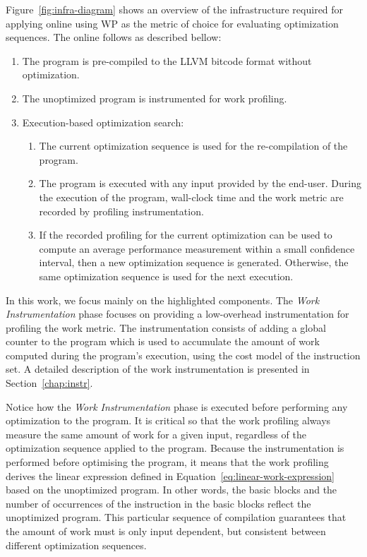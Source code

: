 Figure~\ref{fig:infra-diagram} shows an overview of the infrastructure required for applying online {\itercomp}
using WP as the metric of choice for evaluating optimization sequences.
The online {\itercomp} follows as described bellow:
\begin{enumerate}
\item The program is pre-compiled to the LLVM bitcode format without optimization.
\item The unoptimized program is instrumented for work profiling.
\item Execution-based optimization search:
 \begin{enumerate}
   \item The current optimization sequence is used for the re-compilation of the program.
   \item The program is executed with any input provided by the end-user.
         During the execution of the program, wall-clock time and the work metric are recorded by profiling instrumentation.
   \item If the recorded profiling for the current optimization can be used to compute an average performance measurement within a small confidence interval,
         then a new optimization sequence is generated.
         Otherwise, the same optimization sequence is used for the next execution.
 \end{enumerate}
\end{enumerate}

In this work, we focus mainly on the highlighted components.
The \textit{Work Instrumentation} phase focuses on providing a low-overhead instrumentation for profiling the work metric.
The instrumentation consists of adding a global counter to the program which is used to accumulate the amount of work computed during the program's execution, using the cost model of the instruction set.
A detailed description of the work instrumentation is presented in Section~\ref{chap:instr}.

Notice how the \textit{Work Instrumentation} phase is executed before performing any optimization to the program.
It is critical so that the work profiling always measure the same amount of work for a given input, regardless of the optimization sequence applied to the program.
Because the instrumentation is performed before optimising the program, it means that the work profiling derives the linear expression defined in Equation~\ref{eq:linear-work-expression}
based on the unoptimized program.
In other words, the basic blocks and the number of occurrences of the instruction in the basic blocks reflect the unoptimized program.
This particular sequence of compilation guarantees that the amount of work must is only input dependent, but consistent between different optimization sequences.

